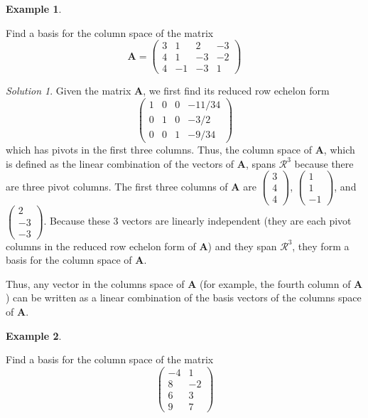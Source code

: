 \documentclass[
]{book}
\theoremstyle{definition}
\theoremstyle{definition}
\newtheorem{example}{Example}[chapter]
\theoremstyle{definition}
\theoremstyle{remark}
\newtheorem*{solution}{Solution}
\begin{document}
\begin{example}
\protect\hypertarget{exm:unlabeled-div-92}{}\label{exm:unlabeled-div-92}

Find a basis for the column space of the matrix
\[
\mathbf{A} = \begin{pmatrix} 3 & 1 & 2 & -3 \\ 4 & 1 & -3 & -2 \\ 4 & -1 & -3 & 1 \end{pmatrix}
\]

\end{example}

\begin{solution}

Given the matrix \(\mathbf{A}\), we first find its reduced row echelon form
\[
\begin{pmatrix} 1 & 0 & 0 & -11/34 \\ 0 & 1 & 0 & -3/2 \\ 0 & 0 & 1 & -9/34 \end{pmatrix}
\]
which has pivots in the first three columns. Thus, the column space of \(\mathbf{A}\), which is defined as the linear combination of the vectors of \(\mathbf{A}\), spans \(\mathcal{R}^3\) because there are three pivot columns. The first three columns of \(\mathbf{A}\) are \(\begin{pmatrix} 3 \\ 4 \\ 4 \end{pmatrix}\), \(\begin{pmatrix} 1 \\ 1 \\ -1 \end{pmatrix}\), and \(\begin{pmatrix} 2 \\ -3 \\ -3 \end{pmatrix}\). Because these 3 vectors are linearly independent (they are each pivot columns in the reduced row echelon form of \(\mathbf{A}\)) and they span \(\mathcal{R}^3\), they form a basis for the column space of \(\mathbf{A}\).

Thus, any vector in the columns space of \(\mathbf{A}\) (for example, the fourth column of \(\mathbf{A}\)) can be written as a linear combination of the basis vectors of the columns space of \(\mathbf{A}\).

\end{solution}

\begin{example}
\protect\hypertarget{exm:unlabeled-div-93}{}\label{exm:unlabeled-div-93}

Find a basis for the column space of the matrix
\[
\begin{pmatrix} -4 & 1 \\ 8 & -2 \\ 6 & 3 \\ 9 & 7 \end{pmatrix}
\]

\end{example}
\end{document}
